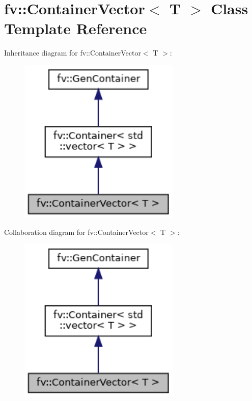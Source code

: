 \hypertarget{classfv_1_1ContainerVector}{}\section{fv\+:\+:Container\+Vector$<$ T $>$ Class Template Reference}
\label{classfv_1_1ContainerVector}


Inheritance diagram for fv\+:\+:Container\+Vector$<$ T $>$\+:
\nopagebreak
\begin{figure}[H]
\begin{center}
\leavevmode
\includegraphics[width=218pt]{classfv_1_1ContainerVector__inherit__graph}
\end{center}
\end{figure}


Collaboration diagram for fv\+:\+:Container\+Vector$<$ T $>$\+:
\nopagebreak
\begin{figure}[H]
\begin{center}
\leavevmode
\includegraphics[width=218pt]{classfv_1_1ContainerVector__coll__graph}
\end{center}
\end{figure}
